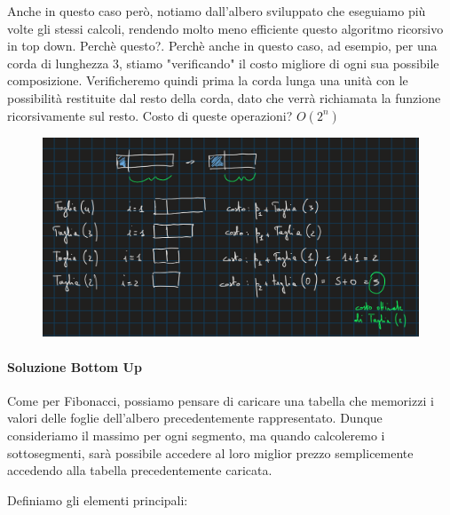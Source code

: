 \documentclass{article}
\begin{document}
Anche in questo caso però, notiamo dall'albero sviluppato che eseguiamo più volte gli stessi calcoli, rendendo molto meno efficiente questo algoritmo ricorsivo in top down. Perchè questo?. Perchè anche in questo caso, ad esempio, per una corda di lunghezza 3, stiamo "verificando" il costo migliore di ogni sua possibile composizione. Verificheremo quindi prima la corda lunga una unità con le possibilità restituite dal resto della corda, dato che verrà richiamata la funzione ricorsivamente sul resto. Costo di queste operazioni? $O(2^{n})$

\begin{figure}[htbp]
        \center
        \includegraphics[scale=0.25]{img/rodCutting2.png}
    \end{figure}

\newpage

\paragraph{Soluzione Bottom Up} Come per Fibonacci, possiamo pensare di caricare una tabella che memorizzi i valori delle foglie dell'albero precedentemente rappresentato. Dunque consideriamo il massimo per ogni segmento, ma quando calcoleremo i sottosegmenti, sarà possibile accedere al loro miglior prezzo semplicemente accedendo alla tabella precedentemente caricata.

Definiamo gli elementi principali:
\end{document}

